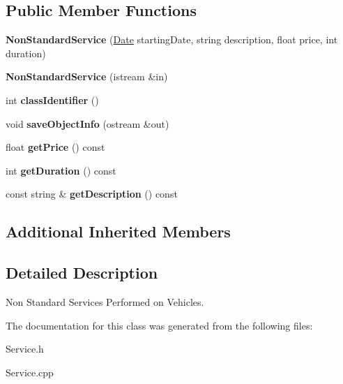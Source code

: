 \subsection*{Public Member Functions}
\begin{DoxyCompactItemize}
\item 
\hypertarget{class_non_standard_service_a3eeab361bd1dc205e4a6abb144af66bf}{}{\bfseries Non\+Standard\+Service} (\hyperlink{struct_date}{Date} starting\+Date, string description, float price, int duration)\label{class_non_standard_service_a3eeab361bd1dc205e4a6abb144af66bf}

\item 
\hypertarget{class_non_standard_service_a669ba4a8b566d49e664f8b4490a41ef6}{}{\bfseries Non\+Standard\+Service} (istream \&in)\label{class_non_standard_service_a669ba4a8b566d49e664f8b4490a41ef6}

\item 
\hypertarget{class_non_standard_service_aa2dc386947829a1bb0ebf10b659346d2}{}int {\bfseries class\+Identifier} ()\label{class_non_standard_service_aa2dc386947829a1bb0ebf10b659346d2}

\item 
\hypertarget{class_non_standard_service_a4ceaaf1e9f8793720598fcb94dad64f4}{}void {\bfseries save\+Object\+Info} (ostream \&out)\label{class_non_standard_service_a4ceaaf1e9f8793720598fcb94dad64f4}

\item 
\hypertarget{class_non_standard_service_a610f7f208834c25a431b7b4830a8425f}{}float {\bfseries get\+Price} () const \label{class_non_standard_service_a610f7f208834c25a431b7b4830a8425f}

\item 
\hypertarget{class_non_standard_service_ad445ce9acca0d4f67a46adad0bc91227}{}int {\bfseries get\+Duration} () const \label{class_non_standard_service_ad445ce9acca0d4f67a46adad0bc91227}

\item 
\hypertarget{class_non_standard_service_a5726d3d995c946a13028a3e396dac2ab}{}const string \& {\bfseries get\+Description} () const \label{class_non_standard_service_a5726d3d995c946a13028a3e396dac2ab}

\end{DoxyCompactItemize}
\subsection*{Additional Inherited Members}


\subsection{Detailed Description}
Non Standard Services Performed on Vehicles. 

The documentation for this class was generated from the following files\+:\begin{DoxyCompactItemize}
\item 
Service.\+h\item 
Service.\+cpp\end{DoxyCompactItemize}
